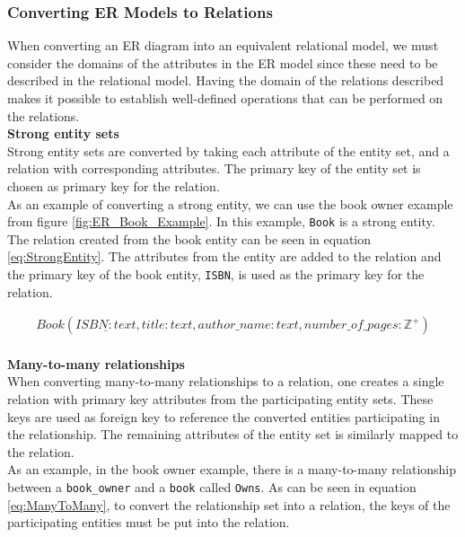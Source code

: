 \subsubsection*{Converting ER Models to Relations}
When converting an ER diagram into an equivalent relational model, we must consider the domains of the attributes in the ER model since these need to be described in the relational model. Having the domain of the relations described makes it possible to establish well-defined operations that can be performed on the relations.\\
\textbf{Strong entity sets}\\
Strong entity sets are converted by taking each attribute of the entity set, and a relation with corresponding attributes. 
The primary key of the entity set is chosen as primary key for the relation\cite{DBSBook}.\\
As an example of converting a strong entity, we can use the book owner example from figure \ref{fig:ER_Book_Example}. In this example, \texttt{Book} is a strong entity. The relation created from the book entity can be seen in equation \ref*{eq:StrongEntity}. The attributes from the entity are added to the relation and the primary key of the book entity, \texttt{ISBN}, is used as the primary key for the relation.

\begin{equation}\label{eq:StrongEntity}
    \begin{split}
        Book(\underline{ISBN : text} , title : text , author\_name : text , number\_of\_pages : \mathbb{Z}^+)
    \end{split}
\end{equation}
\\
\textbf{Many-to-many relationships}\\
When converting many-to-many relationships to a relation, one creates a single relation with primary key attributes from the participating entity sets\cite{DBSBook}. These keys are used as foreign key to reference the converted entities participating in the relationship. 
The remaining attributes of the entity set is similarly mapped to the relation.\\
As an example, in the book owner example, there is a many-to-many relationship between a \texttt{book\_owner} and a \texttt{book} called \texttt{Owns}. As can be seen in equation \ref{eq:ManyToMany}, to convert the relationship set into a relation, the keys of the participating entities must be put into the relation. 

